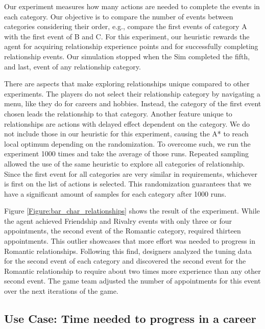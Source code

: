 \documentclass[letterpaper]{article} %
\begin{document}
Our experiment measures how many actions are needed to complete the events in each category. Our objective is to compare the number of events between categories considering their order, e.g., compare the first events of category A with the first event of B and C. For this experiment, our heuristic rewards the agent for acquiring relationship experience points and for successfully completing relationship events. Our simulation stopped when the Sim completed the fifth, and last, event of any relationship category.

There are aspects that make exploring relationships unique compared to other experiments. The players do not select their relationship category by navigating a menu, like they do for careers and hobbies. Instead, the category of the first event chosen leads the relationship to that category. Another feature unique to relationships are actions with delayed effect dependent on the category. We do not include those in our heuristic for this experiment, causing the A* to reach local optimum depending on the randomization. To overcome such, we run the experiment 1000 times and take the average of those runs. Repeated sampling allowed the use of the same heuristic to explore all categories of relationship. Since the first event for all categories are very similar in requirements, whichever is first on the list of actions is selected. This randomization guarantees that we have a significant amount of samples for each category after 1000 runs.

Figure \ref{Figure:bar_char_relationships} shows the result of the experiment. While the agent achieved Friendship and Rivalry events with only three or four appointments, the second event of the Romantic category, required thirteen appointments. This outlier showcases that more effort was needed to progress in Romantic relationships. Following this find, designers analyzed the tuning data for the second event of each category and discovered the second event for the Romantic relationship to require about two times more experience than any other second event. The game team adjusted the number of appointments for this event over the next iterations of the game.

\subsection{Use Case: Time needed to progress in a career}
\end{document}
